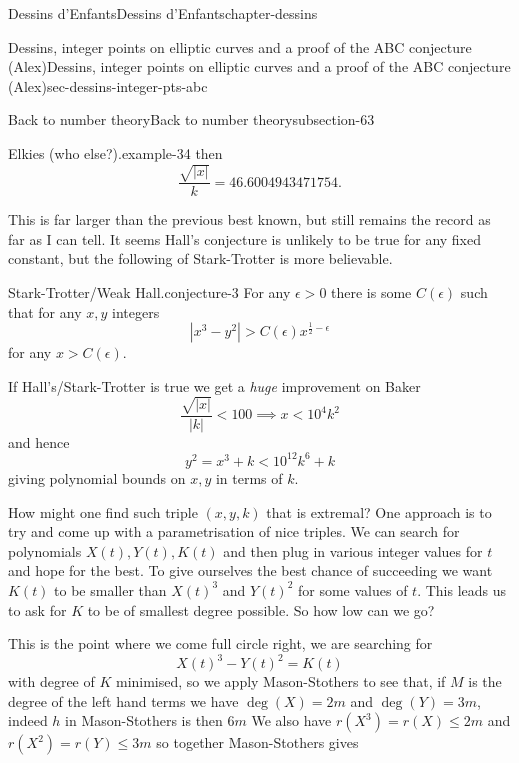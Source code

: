 \documentclass[oneside,10pt,]{book}
\numberwithin{equation}{section}
\newcommand{\lt}{<}
\newcommand{\gt}{>}
\begin{document}
\begin{chapterptx}{Dessins d'Enfants}{}{Dessins d'Enfants}{}{}{chapter-dessins}
\begin{sectionptx}{Dessins, integer points on elliptic curves and a proof of the ABC conjecture (Alex)}{}{Dessins, integer points on elliptic curves and a proof of the ABC conjecture (Alex)}{}{}{sec-dessins-integer-pts-abc}
\begin{subsectionptx}{Back to number theory}{}{Back to number theory}{}{}{subsection-63}
\begin{example}{Elkies (who else?).}{example-34}
then%
\begin{equation*}
\frac{\sqrt{|x|}}{k} = 46.6004943471754\text{.}
\end{equation*}
%
\end{example}
\hypertarget{p-715}{}%
This is far larger than the previous best known, but still remains the record as far as I can tell. It seems Hall's conjecture is unlikely to be true for any fixed constant, but the following of Stark-Trotter is more believable.%
\begin{conjecture}{Stark-Trotter/Weak Hall.}{}{conjecture-3}%
\hypertarget{p-716}{}%
For any  \(\epsilon \gt 0\) there is some \(C(\epsilon)\) such that for any \(x,y\) integers%
\begin{equation*}
|x^3 - y^2| \gt C(\epsilon) x^{\frac12 - \epsilon}
\end{equation*}
for any \(x \gt C(\epsilon)\).%
\end{conjecture}
\hypertarget{p-717}{}%
If Hall's/Stark-Trotter is true we get a \emph{huge} improvement on Baker%
\begin{equation*}
\frac{\sqrt{|x|}}{|k|} \lt 100 \implies x \lt 10^4k^2
\end{equation*}
and hence%
\begin{equation*}
y^2 = x^3 + k \lt 10^{12}k^6 + k
\end{equation*}
giving polynomial bounds on \(x,y\) in terms of \(k\).%
\par
\hypertarget{p-718}{}%
How might one find such triple \((x,y,k)\) that is extremal? One approach is to try and come up with a parametrisation of nice triples. We can search for polynomials \(X(t),Y(t), K(t)\) and then plug in various integer values for \(t\) and hope for the best. To give ourselves the best chance of succeeding we want \(K(t)\) to be smaller than \(X(t)^3\) and \(Y(t)^2\) for some values of \(t\). This leads us to ask for \(K\) to be of smallest degree possible. So how low can we go?%
\par
\hypertarget{p-719}{}%
This is the point where we come full circle right, we are searching for%
\begin{equation*}
X(t)^3 - Y(t)^2 = K(t)
\end{equation*}
with degree of \(K\) minimised, so we apply Mason-Stothers to see that, if \(M\) is the degree of the left hand terms we have \(\deg(X) = 2m\) and \(\deg (Y) = 3m\), indeed \(h\) in Mason-Stothers is then \(6m\) We also have \(r(X^3) = r(X) \le 2m\) and \(r(X^2) = r(Y) \le 3m\) so together Mason-Stothers gives%
\begin{equation*}

\end{equation*}
\end{subsectionptx}
\end{sectionptx}
\end{chapterptx}
\end{document}
